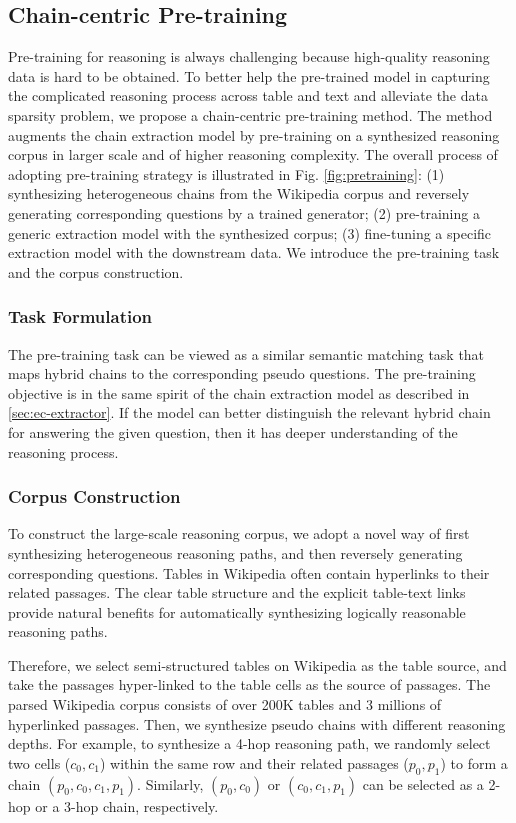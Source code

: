 \documentclass[11pt]{article}
\begin{document}
	\subsection{Chain-centric Pre-training}\label{sec:ec-pretrain}
	Pre-training for reasoning is always challenging because high-quality reasoning data is hard to be obtained.
	To better help the pre-trained model in capturing the complicated reasoning process across table and text and alleviate the data sparsity problem, we propose a chain-centric pre-training method.
	The method augments the chain extraction model by pre-training on a synthesized reasoning corpus in larger scale and of higher reasoning complexity.
	The overall process of adopting pre-training strategy is illustrated in Fig. \ref{fig:pretraining}: 
	(1) synthesizing heterogeneous chains from the Wikipedia corpus and reversely generating corresponding questions by a trained generator;
(2) pre-training a generic extraction model with the synthesized corpus; 
(3) fine-tuning a specific extraction model with the downstream data. 
	We introduce the pre-training task and the corpus construction.
	
	\subsubsection{Task Formulation}
	The pre-training task can be viewed as a similar semantic matching task that maps hybrid chains to the corresponding pseudo questions. 
	The pre-training objective is in the same spirit of the chain extraction model as described in \cref{sec:ec-extractor}.
	If the model can better distinguish the relevant hybrid chain for answering the given question, then it has deeper understanding of the reasoning process.
	\subsubsection{Corpus Construction}
	
	To construct the large-scale reasoning corpus, we adopt a novel way of first synthesizing heterogeneous reasoning paths, and then reversely generating corresponding questions. 
	Tables in Wikipedia often contain hyperlinks to their related passages. 
	The clear table structure and the explicit table-text links provide natural benefits for automatically synthesizing logically reasonable reasoning paths. 
	
	Therefore, we select semi-structured tables on Wikipedia as the table source, and take the passages hyper-linked to the table cells as the source of passages. 
	The parsed Wikipedia corpus consists of over 200K tables and 3 millions of hyperlinked passages.
	Then, we synthesize pseudo chains with different reasoning depths. 
	For example, to synthesize a 4-hop reasoning path, we randomly select two cells ($c_0, c_1$) within the same row and their related passages ($p_0,p_1$) to form a chain $(p_0, c_0, c_1, p_1)$. Similarly, $(p_0, c_0)$ or $(c_0, c_1,p_1)$ can be selected as a 2-hop or a 3-hop chain, respectively. 
	
\end{document}
